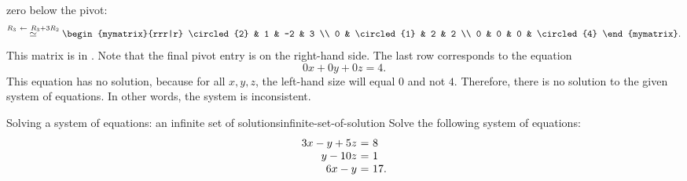 \begin{solution}
  zero below the pivot:
  \begin{equation*}
    \stackrel{R_3\rowop R_3+3R_2}{\roweq}
    \begin{mymatrix}{rrr|r}
      \circled{2} &  1 &  -2 & 3 \\
      0 &  \circled{1} &   2 & 2 \\
      0 & 0 & 0 & \circled{4}
    \end{mymatrix}.
  \end{equation*}
  This matrix is in {\ef}. Note that the final pivot entry is on the
  right-hand side. The last row corresponds to the equation
  \begin{equation*}
    0x + 0y + 0z = 4.
  \end{equation*}
  This equation has no solution, because for all $x,y,z$, the
  left-hand size will equal $0$ and not $4$. Therefore, there is no
  solution to the given system of equations. In other words, the
  system is inconsistent.
\end{solution}

\begin{example}{Solving a system of equations: an infinite set of solutions}{infinite-set-of-solution}
  Solve the following system of equations:
  \begin{equation}
    \begin{array}{r@{~}c@{~}l}
      3x  -y + 5z  &=& 8 \\
      y - 10z &=& 1 \\
      6x  -y       &=& 17.
    \end{array}
  \end{equation}
\end{example}

